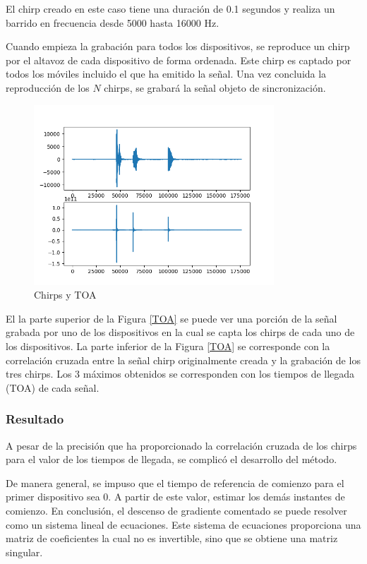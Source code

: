 \documentclass[a4paper,11pt]{book}
\begin{document}
El chirp creado en este caso tiene una duración de 0.1 segundos y realiza un barrido en frecuencia desde 5000 hasta 16000 Hz.


Cuando empieza la grabación para todos los dispositivos, se reproduce un chirp por el altavoz de cada dispositivo de forma ordenada. Este chirp es captado por todos los móviles incluido el que ha emitido la señal. Una vez concluida la reproducción de los $N$ chirps, se grabará la señal objeto de sincronización.

\begin{figure}[hbtp]
\centering
\includegraphics[width = 9cm]{FIGURAS/TOA.png}
\caption{Chirps y TOA}
\end{figure}


El la parte superior de la Figura \ref{TOA} se puede ver una porción de la señal grabada por uno de los dispositivos en la cual se capta los chirps de cada uno de los dispositivos. La parte inferior de la Figura \ref{TOA} se corresponde con la correlación cruzada entre la señal chirp originalmente creada y la grabación de los tres chirps. Los 3 máximos obtenidos se corresponden con los tiempos de llegada (TOA) de cada señal. 

\subsubsection{Resultado}
A pesar de la precisión que ha proporcionado la correlación cruzada de los chirps para el valor de los tiempos de llegada, se complicó el desarrollo del método.

De manera general, se impuso que el tiempo de referencia de comienzo para el primer dispositivo sea 0. A partir de este valor, estimar los demás instantes de comienzo. En conclusión, el descenso de gradiente comentado se puede resolver como un sistema lineal de ecuaciones. Este sistema de ecuaciones proporciona una matriz de coeficientes la cual no es invertible, sino que se obtiene una matriz singular.
\end{document}
